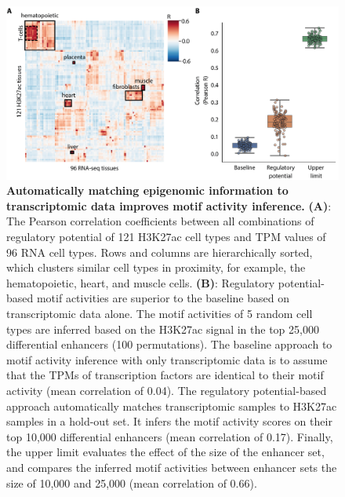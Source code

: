 \begin{figure}
    \centering
    \includegraphics[width=1\linewidth]{ch.scepia/imgs/CellTypes_MvS_Myriad_Figure1.png}
    \caption{\textbf{Automatically matching epigenomic information to transcriptomic data improves motif activity inference.} \textbf{(A)}: The Pearson correlation coefficients between all combinations of regulatory potential of 121 H3K27ac cell types and TPM values of 96 RNA cell types. Rows and columns are hierarchically sorted, which clusters similar cell types in proximity, for example, the hematopoietic, heart, and muscle cells. \textbf{(B)}: Regulatory potential-based motif activities are superior to the baseline based on transcriptomic data alone. The motif activities of 5 random cell types are inferred based on the H3K27ac signal in the top 25,000 differential enhancers (100 permutations). The baseline approach to motif activity inference with only transcriptomic data is to assume that the TPMs of transcription factors are identical to their motif activity (mean correlation of 0.04). The regulatory potential-based approach automatically matches transcriptomic samples to H3K27ac samples in a hold-out set. It infers the motif activity scores on their top 10,000 differential enhancers (mean correlation of 0.17). Finally,  the upper limit evaluates the effect of the size of the enhancer set, and compares the inferred motif activities between enhancer sets the size of 10,000 and 25,000 (mean correlation of 0.66).}
    \label{fig:bulk_comparison}
\end{figure}

